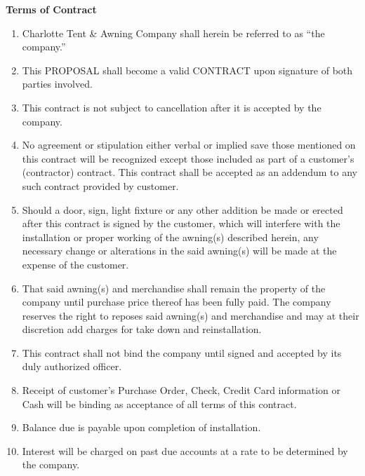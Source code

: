\documentclass[11pt]{article}
\begin{document}
\centerline{\Large\textbf{Terms of Contract}}
\begin{enumerate}[rightmargin=0.5in]
    \item Charlotte Tent \& Awning Company shall herein be referred to as ``the company.''
    \item This PROPOSAL shall become a valid CONTRACT upon signature of both parties involved.
    \item This contract is not subject to cancellation after it is accepted by the company.
    \item No agreement or stipulation either verbal or implied save those mentioned on this contract will be recognized except those included as part of a customer's (contractor) contract. This contract shall be accepted as an addendum to any such contract provided by customer.
    \item Should a door, sign, light fixture or any other addition be made or erected after this contract is signed by the customer, which will interfere with the installation or proper working of the awning(s) described herein, any necessary change or alterations in the said awning(s) will be made at the expense of the customer.
    \item That said awning(s) and merchandise shall remain the property of the company until purchase price thereof has been fully paid. The company reserves the right to reposes said awning(s) and merchandise and may at their discretion add charges for take down and reinstallation.
    \item This contract shall not bind the company until signed and accepted by its duly authorized officer.
    \item Receipt of customer's Purchase Order, Check, Credit Card information or Cash will be binding as acceptance of all terms of this contract.
    \item Balance due is payable upon completion of installation.
    \item Interest will be charged on past due accounts at a rate to be determined by the company.
\end{enumerate}

\ctafooter
\end{document}
